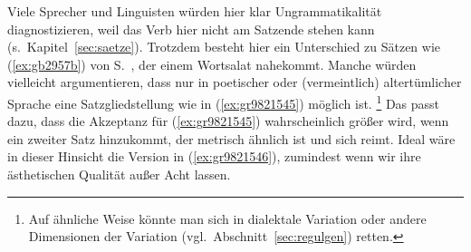 \begin{exe}
\end{exe}

Viele Sprecher und Linguisten würden hier klar Ungrammatikalität diagnostizieren, weil das Verb hier nicht am Satzende stehen kann (s.\ Kapitel~\ref{sec:saetze}).
Trotzdem besteht hier ein Unterschied zu Sätzen wie (\ref{ex:gb2957b}) von S.\ \pageref{ex:gb2957b}, der einem Wortsalat nahekommt.
Manche würden vielleicht argumentieren, dass nur in poetischer oder (vermeintlich) altertümlicher Sprache eine Satzgliedstellung wie in (\ref{ex:gr9821545}) möglich ist.%
\footnote{Auf ähnliche Weise könnte man sich in dialektale Variation oder andere Dimensionen der Variation (vgl.\ Abschnitt~\ref{sec:regulgen}) retten.}
Das passt dazu, dass die Akzeptanz für (\ref{ex:gr9821545}) wahrscheinlich größer wird, wenn ein zweiter Satz hinzukommt, der metrisch ähnlich ist und sich reimt.
Ideal wäre in dieser Hinsicht die Version in (\ref{ex:gr9821546}), zumindest wenn wir ihre ästhetischen Qualität außer Acht lassen.

\begin{exe}
\end{exe}

